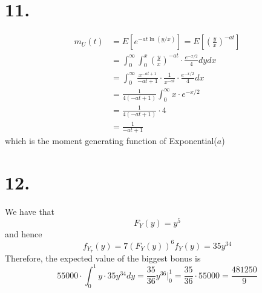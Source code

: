 \documentclass[11pt]{article}
\begin{document}
\section*{11.}
\begin{equation*}
    \begin{aligned}
        m_U(t) &= E[e^{-at\ln(y/x)}] = E\left[\left(\frac{y}{x}\right)^{-at}\right] \\
        &= \int_0^\infty \int_0^x \left(\frac{y}{x}\right)^{-at} \cdot \frac{e^{-x/2}}{4} dydx \\
        &= \int_0^\infty \frac{x^{-at+1}}{-at+1} \cdot \frac{1}{x^{-at}} \cdot \frac{e^{-x/2}}{4} dx \\
        &= \frac{1}{4(-at+1)}\int_0^\infty x \cdot e^{-x/2} \\
        &= \frac{1}{4(-at+1)} \cdot 4 \\
        &= \frac{1}{-at+1}
    \end{aligned}
\end{equation*} 
which is the moment generating function of Exponential($a$)
\pagebreak
\section*{12.}
We have that
\[
    F_Y(y) = y^5    
\]
and hence
\[
    f_{Y_7}(y) = 7(F_Y(y))^6 f_Y(y) = 35y^{34}
\]
Therefore, the expected value of the biggest bonus is 
\[
    55000 \cdot \int_0^1 y \cdot 35y^{34} dy = \frac{35}{36}y^{36} |^1_0 = \frac{35}{36} \cdot 55000 = \frac{481250}{9}
\]
\pagebreak
\end{document}
